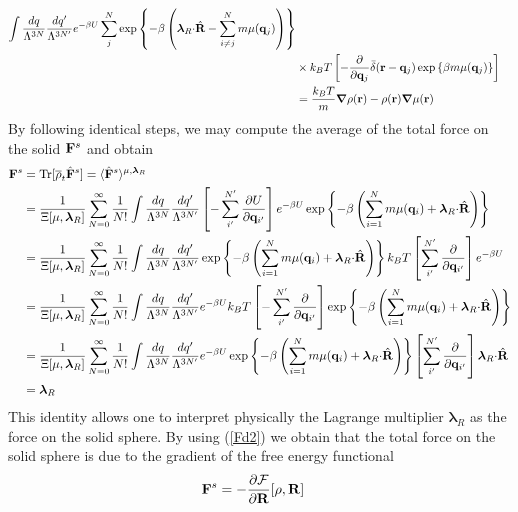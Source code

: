 \documentclass[b5paper,openright,11pt]{book}
\begin{document}
\begin{appendices}
\begin{align}
\int \frac{dq}{\Lambda^{3N}}\frac{dq'}{\Lambda^{3N'}}
e^{-\beta U}
\sum^{N}_{j}\exp\left\{-\beta  \left( \boldsymbol{\lambda}_R{\cdot}\hat{\bf R}
-\sum_{i\neq j}^N m\mu({\bf   q}_j)\right)\right\}
\nonumber\\
&\times k_BT\left[-\frac{\partial }{\partial {\bf q}_{j}}\bar{\delta}({\bf r}-{\bf q}_j)
\exp\left\{\beta   m\mu({\bf   q}_j)\right\}\right]
\nonumber\\
&=\frac{k_BT}{m}\boldsymbol{\nabla} \rho({\bf r})
-\rho({\bf r})\boldsymbol{\nabla}\mu({\bf r})
\label{fllr}
\end{align}
By following identical steps, we may compute the average of the total force on the solid ${\bf F}^s$
and obtain
\begin{align}
{\bf F}^s&={\rm Tr}[\overline{\rho}_t \hat{\bf F}^s]=
 \langle \hat{\bf F}^s\rangle^{\mu,\boldsymbol{\lambda}_R} 
\nonumber\\
&=\frac{1}{\Xi[\mu,\boldsymbol{\lambda}_R]}
 \sum_{N=0}^\infty \frac{1}{N!}
\int \frac{dq}{\Lambda^{3N}}\frac{dq'}{\Lambda^{3N'}}
\left[-\sum^{N'}_{i'}\frac{\partial U}{\partial {\bf q}_{i'}}\right]
e^{-\beta U}
\exp\left\{-\beta  \left(\sum_{i=1}^N m\mu({\bf
    q}_i)+ \boldsymbol{\lambda}_R{\cdot}\hat{\bf R}\right)\right\}
\nonumber\\
&=
\frac{1}{\Xi[\mu,\boldsymbol{\lambda}_R]}
 \sum_{N=0}^\infty \frac{1}{N!}
\int \frac{dq}{\Lambda^{3N}}\frac{dq'}{\Lambda^{3N'}}
\exp\left\{-\beta  \left(\sum_{i=1}^N m\mu({\bf
    q}_i)+ \boldsymbol{\lambda}_R{\cdot}\hat{\bf R}\right)\right\}
k_BT\left[\sum^{N'}_{i'}\frac{\partial }{\partial {\bf q}_{i'}}\right]e^{-\beta U}
\nonumber\\
&=
\frac{1}{\Xi[\mu,\boldsymbol{\lambda}_R]}
 \sum_{N=0}^\infty \frac{1}{N!}
\int \frac{dq}{\Lambda^{3N}}\frac{dq'}{\Lambda^{3N'}}
e^{-\beta U}
k_BT\left[-\sum^{N'}_{i'}\frac{\partial }{\partial {\bf q}_{i'}}\right]\exp\left\{-\beta  \left(\sum_{i=1}^N m\mu({\bf
    q}_i)+ \boldsymbol{\lambda}_R{\cdot}\hat{\bf R}\right)\right\}
\nonumber\\
&=
\frac{1}{\Xi[\mu,\boldsymbol{\lambda}_R]}
 \sum_{N=0}^\infty \frac{1}{N!}
\int \frac{dq}{\Lambda^{3N}}\frac{dq'}{\Lambda^{3N'}}
e^{-\beta U}
\exp\left\{-\beta  \left(\sum_{i=1}^N m\mu({\bf
    q}_i)+ \boldsymbol{\lambda}_R{\cdot}\hat{\bf R}\right)\right\}
\left[\sum^{N'}_{i'}\frac{\partial }{\partial {\bf q}_{i'}}\right] \boldsymbol{\lambda}_R{\cdot}\hat{\bf R}
\nonumber\\
&=\boldsymbol{\lambda}_R
\label{lf}\end{align}
This  identity  allows  one  to  interpret  physically  the  Lagrange
multiplier $\boldsymbol{\lambda}_R$ as the  force on the solid sphere.
By  using (\ref{Fd2})  we obtain  that the  total force  on the  solid
sphere is due to the gradient of the free energy functional
\begin{align}
{\bf F}^s&=-\frac{\partial  {\cal F}}{\partial{\bf R}}[\rho,{\bf R}]
\label{Fls}
\end{align}


\end{appendices}
\end{document}
